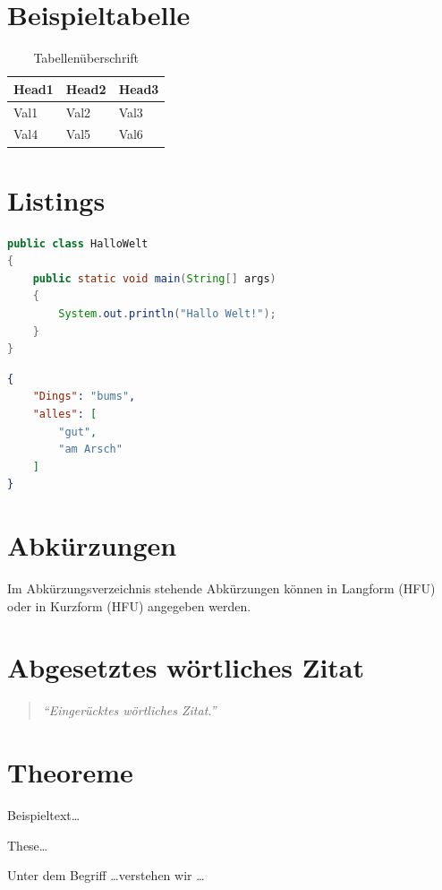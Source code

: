 \section{Beispieltabelle}

\begin{table}
\caption{Tabellenüberschrift}
\center
\footnotesize
\begin{tabular}{lll}
\toprule
Head1 & Head2 & Head3 \\
\midrule
Val1 & Val2 & Val3 \\
Val4 & Val5 & Val6 \\
\bottomrule
\end{tabular}
\end{table}

\section{Listings}

\begin{lstlisting}[language=java, caption=Hallo Welt in Java]
public class HalloWelt 
{
	public static void main(String[] args) 
	{
		System.out.println("Hallo Welt!");
	}
}
\end{lstlisting}


\begin{lstlisting}[language=json, caption=JSON Datei]
{
	"Dings": "bums",
	"alles": [
		"gut",
		"am Arsch"
	]
}
\end{lstlisting}


\section{Abkürzungen}

Im Abkürzungsverzeichnis stehende Abkürzungen können in Langform (\ac{HFU}) oder in Kurzform (\acs{HFU}) angegeben werden.

\section{Abgesetztes wörtliches Zitat}

\lipsum[10]

\begin{quote}
\textit{\enquote{Eingerücktes wörtliches Zitat.}}\cite[S. 14ff]{ParquetStats}
\end{quote}

\lipsum[10]

\section{Theoreme}

\lipsum[2]

\begin{beispiel}
Beispieltext\dots
\end{beispiel}
 
\lipsum[2]

\begin{these}
These\dots
\end{these}
 
\lipsum[2]
 
\begin{definition}
Unter dem Begriff \dots verstehen wir \dots
\end{definition}

\lipsum[2]